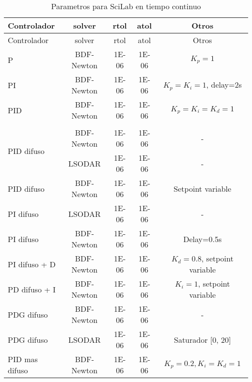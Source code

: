         {\setlength\LTleft{0pt}
        \setlength\LTright{0pt}
        \centering
        \footnotesize
        \renewcommand{\arraystretch}{0.89}
        \begin{longtable}{l @{\extracolsep{\fill}} cccc}
        \caption[Parametros para SciLab en tiempo continuo]{Parametros para SciLab en tiempo continuo} 
        \label{tab:parametrosSciLabc} \\
        \toprule
        Controlador  & solver & rtol & atol & Otros       \\ \midrule
        \endfirsthead
        \toprule
        Controlador  & solver & rtol & atol & Otros       \\ \midrule
        \endhead
        \bottomrule
        \endfoot
         P                          & BDF-Newton & \num{1E-06} & \num{1E-06} & $K_p=1$                       \\
         PI                         & BDF-Newton & \num{1E-06} & \num{1E-06} & $K_p=K_i=1$, delay=2s         \\
         PID                        & BDF-Newton & \num{1E-06} & \num{1E-06} & $K_p=K_i=K_d=1$               \\
                                    &            &             &             &                               \\[-3pt]        
         \multirow{2}{*}{PID difuso}& BDF-Newton & \num{1E-06} & \num{1E-06} & -                             \\
                                    & LSODAR     & \num{1E-06} & \num{1E-06} & -                             \\
         PID difuso                 & BDF-Newton & \num{1E-06} & \num{1E-06} & Setpoint variable             \\
         PI difuso                  & LSODAR     & \num{1E-06} & \num{1E-06} & -                             \\
         PI difuso                  & BDF-Newton & \num{1E-06} & \num{1E-06} & Delay=0.5s                    \\
         PI difuso + D              & BDF-Newton & \num{1E-06} & \num{1E-06} & $K_d=0.8$, setpoint variable  \\
         PD difuso + I              & BDF-Newton & \num{1E-06} & \num{1E-06} & $K_i=1$, setpoint variable    \\
         PDG difuso                 & BDF-Newton & \num{1E-06} & \num{1E-06} & -                             \\
         PDG difuso                 & LSODAR     & \num{1E-06} & \num{1E-06} & Saturador [0, 20]             \\
         PID mas difuso             & BDF-Newton & \num{1E-06} & \num{1E-06} & $K_p=0.2, K_i=K_d=1$          \\
        \end{longtable}}

